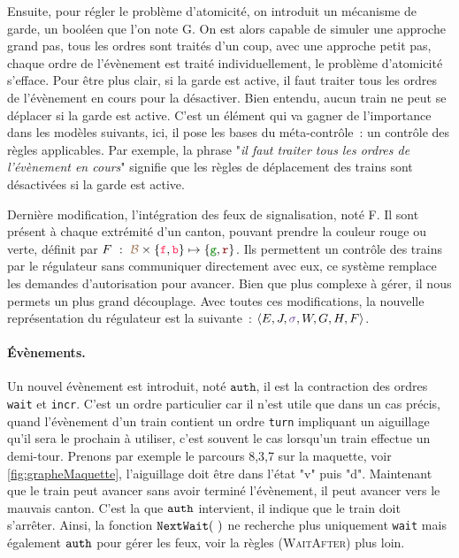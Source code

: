 \documentclass[oneside, a4paper, 11pt]{book}
\newcommand{\ruleFmt}[1]{\textsc{(#1)}}
\newcommand{\ruleDef}[1]{\hypertarget{#1}{\ruleFmt{#1}}}
\newcommand{\forward}{\ensuremath{\mathtt{f}}}
\newcommand{\backward}{\ensuremath{\mathtt{b}}}
\newcommand{\dirFmt}[1]{{\color{dircolor} #1}}
\newcommand{\dirForward}{\ensuremath{\dirFmt{\forward}}}
\newcommand{\dirBackward}{\ensuremath{\dirFmt{\backward}}}
\newcommand{\posFmt}[1]{{\color{poscolor}{#1}}}
\newcommand{\authOrder}{{\mbox{\ensuremath{\mathtt{auth}}}}}
\newcommand{\swFmt}[1]{{\color{swcolor}{#1}}}
\newcommand{\sigred}{{\mbox{${\color{red!50!black}\mathtt{r}}$}}}
\newcommand{\siggreen}{{\mbox{${\color{green!50!black}\mathtt{g}}$}}}
\newcommand{\nextWait}[1]{\ensuremath{{\tt NextWait}(#1)}}
\newcommand{\regM}[7]{\langle #1, #2, #3, #4, #5, #6, #7 \rangle}
\begin{document}
Ensuite, pour régler le problème d'atomicité, on introduit un mécanisme de garde, un booléen que l'on note G. On est alors capable de simuler une approche grand pas, tous les ordres sont traités d'un coup, avec une approche petit pas, chaque ordre de l'évènement est traité individuellement, le problème d'atomicité s'efface.
Pour être plus clair, si la garde est active, il faut traiter tous les ordres de l'évènement en cours pour la désactiver. Bien entendu, aucun train ne peut se déplacer si la garde est active.
C'est un élément qui va gagner de l'importance dans les modèles suivants, ici, il pose les bases du méta-contrôle~: un contrôle des règles applicables. Par exemple, la phrase "\textit{il faut traiter tous les ordres de l'évènement en cours}" signifie que les règles de déplacement des trains sont désactivées si la garde est active.

Dernière modification, l'intégration des feux de signalisation, noté F. Il sont présent à chaque extrémité d'un canton, pouvant prendre la couleur rouge ou verte, définit par $F~:~\posFmt{\mathcal{B}} \times \{\dirForward,\dirBackward\} \mapsto \{\siggreen, \sigred\}$. Ils permettent un contrôle des trains par le régulateur sans communiquer directement avec eux, ce système remplace les demandes d'autorisation pour avancer. Bien que plus complexe à gérer, il nous permets un plus grand découplage.
Avec toutes ces modifications, la nouvelle représentation du régulateur est la suivante~: $\regM{E}{J}{\swFmt{\sigma}}{W}{G}{H}{F}$.


\paragraph{Évènements.}
Un nouvel évènement est introduit, noté \authOrder, il est la contraction des ordres \texttt{wait} et \texttt{incr}. C'est un ordre particulier car il n'est utile que dans un cas précis, quand l'évènement d'un train contient un ordre \texttt{turn} impliquant un aiguillage qu'il sera le prochain à utiliser, c'est souvent le cas lorsqu'un train effectue un demi-tour. Prenons par exemple le parcours 8,3,7 sur la maquette, voir \ref{fig:grapheMaquette}, l'aiguillage doit être dans l'état "v" puis "d".
Maintenant que le train peut avancer sans avoir terminé l'évènement, il peut avancer vers le mauvais canton. C'est la que $\authOrder$ intervient, il indique que le train doit s'arrêter. Ainsi, la fonction \nextWait{~} ne recherche plus uniquement \texttt{wait} mais également $\authOrder$ pour gérer les feux, voir la règles \ruleDef{WaitAfter} plus loin.
\end{document}
